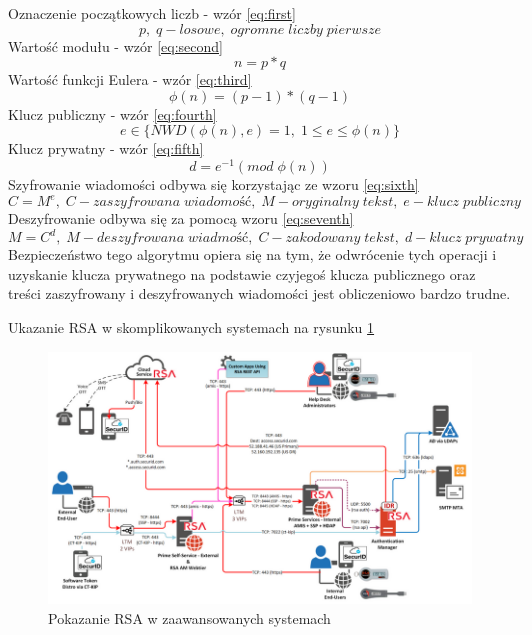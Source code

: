 Oznaczenie początkowych liczb - wzór \ref{eq:first}
\begin{equation}
    p, \; q-losowe, \; ogromne \; liczby \; pierwsze
    \label{eq:first}
\end{equation}
Wartość modułu - wzór \ref{eq:second}
\begin{equation}
    n=p*q
    \label{eq:second}
\end{equation}
Wartość funkcji Eulera - wzór \ref{eq:third}
\begin{equation}
    \phi(n)=(p-1)*(q-1)
    \label{eq:third}
\end{equation}
Klucz publiczny - wzór \ref{eq:fourth}
\begin{equation}
    e \in \{NWD(\phi(n),e)=1, \; 1 \leqslant e \leqslant \phi(n)\}
    \label{eq:fourth}
\end{equation}
Klucz prywatny - wzór \ref{eq:fifth}
\begin{equation}
    d= e^{-1} (mod \; \phi(n))
    \label{eq:fifth}
\end{equation}
Szyfrowanie wiadomości odbywa się korzystając ze wzoru \ref{eq:sixth}
\begin{equation}
    C= M^e, \; C-zaszyfrowana \;  wiadomość, \; M-oryginalny \; tekst, \; e-klucz \; publiczny
    \label{eq:sixth}
\end{equation}
Deszyfrowanie odbywa się za pomocą wzoru \ref{eq:seventh}
\begin{equation}
    M= C^d, \; M-deszyfrowana \; wiadmość, \;C-zakodowany \; tekst, \; d-klucz \; prywatny
    \label{eq:seventh}
\end{equation}
Bezpieczeństwo tego algorytmu opiera się na tym, że odwrócenie tych operacji i uzyskanie klucza prywatnego na podstawie czyjegoś klucza publicznego oraz treści zaszyfrowany i deszyfrowanych wiadomości jest obliczeniowo bardzo trudne.

Ukazanie RSA w skomplikowanych systemach na rysunku \ref{fig:RSASieci}
\begin{figure}[H]
    \centering
    \includegraphics[width=\textwidth]{Images/RSASieci.png}
    \caption{Pokazanie RSA w zaawansowanych systemach}
    \label{fig:RSASieci}
\end{figure}

